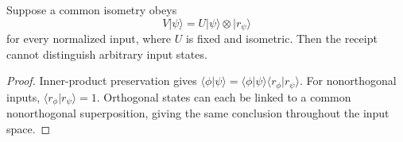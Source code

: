 \setcounter{theorem}{0}
\begin{proposition}
Suppose a common isometry obeys
\[
V|\psi\rangle=U|\psi\rangle\otimes|r_\psi\rangle
\]
for every normalized input, where $U$ is fixed and isometric. Then the receipt cannot distinguish arbitrary input states.
\end{proposition}
\begin{proof}
Inner-product preservation gives
$\langle\phi|\psi\rangle=\langle\phi|\psi\rangle\langle r_\phi|r_\psi\rangle$.
For nonorthogonal inputs, $\langle r_\phi|r_\psi\rangle=1$. Orthogonal states can each be linked to a common nonorthogonal superposition, giving the same conclusion throughout the input space.
\end{proof}
